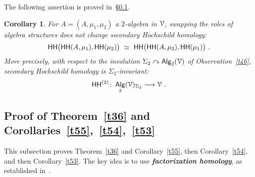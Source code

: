 \documentclass{amsart}
\newtheorem{cor}[theorem]{Corollary}
\theoremstyle{definition}
\theoremstyle{remark}
\DeclareMathOperator{\Alg}{\sf Alg}
\newcommand{\bit}[1]{\textbf{\textit{#1}}}
\newcommand{\lacts}{\curvearrowright}
\DeclareMathOperator{\sHH}{\sf HH}
\DeclareMathOperator{\HHt}{{\sf HH}^{(2)}}
\begin{document}
The following assertion is proved in~\S\ref{sec.fact.hmlgy}.
\begin{cor}
\label{t45}
For $A = (A,\mu_1,\mu_2)$ a $2$-algebra in $\mathcal V$, swapping the roles of algebra structures does not change secondary Hochschild homology:
\[
\sHH\bigl( 
\sHH(A,\mu_1)
,
\sHH(\mu_2)
\bigr)
~\simeq~
\sHH\bigl( 
\sHH(A,\mu_2)
,
\sHH(\mu_1)
\bigr)
~.
\]
More precisely, with respect to the involution $\Sigma_2 \lacts \Alg_2(\cV)$ of Observation~\ref{t46}, secondary Hochschild homology is $\Sigma_2$-invariant:
\[
\HHt\colon \Alg_2(\cV)_{\Sigma_2}
\longrightarrow
\cV
~.
\]

\end{cor}












































\subsection{Proof of Theorem~\ref{t36} and Corollaries~\ref{t55},~\ref{t54},~\ref{t53}}
\label{sec.fact.hmlgy}
This subsection proves Theorem~\ref{t36} and Corollary~\ref{t55}, then Corollary~\ref{t54}, and then Corollary~\ref{t53}.  
The key idea is to use \bit{factorization homology}, as established in~\cite{old.fact}.  
\end{document}
